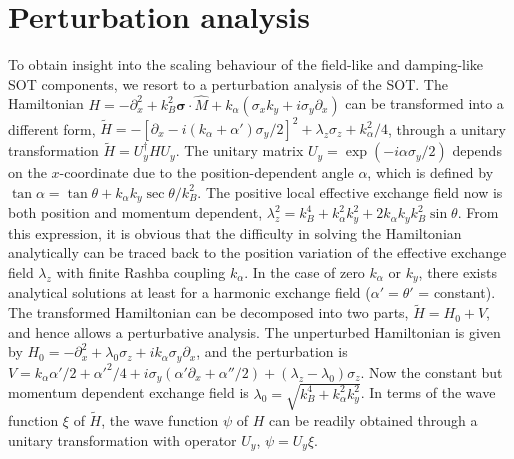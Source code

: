 \documentclass[12pt]{iopart}
\begin{document}
\section{Perturbation analysis}
\label{pertb}
To obtain insight into the scaling behaviour of the field-like and damping-like SOT components, we resort to a perturbation analysis of the SOT. The Hamiltonian $H = - \partial_x ^2 + k_B^2 \bm {\sigma } \cdot \hat {M} +  k_ \alpha (\sigma_x k_y + i \sigma_y \partial_x)$ can be transformed into a different form, $\tilde {H} = - [\partial_x - i (k_ \alpha + \alpha') \sigma_y/2 ]^2 + \lambda_z \sigma_z + k_ \alpha ^2/4$, through a unitary transformation $\tilde {H} = U_y^ \dagger H U_y$. The unitary matrix $U_y = \exp {(-i \alpha \sigma_y/2)}$ depends on the $x$-coordinate due to the position-dependent angle $\alpha$, which is defined by $\tan \alpha = \tan \theta + k_ \alpha k_y \sec \theta/k_B^2$. The positive local effective exchange field now is both position and momentum dependent, $\lambda_z^2 = k_B^4 + k_ \alpha^2 k_y^2 + 2 k_ \alpha k_y k_B^2 \sin \theta$. From this expression, it is obvious that the difficulty in solving the Hamiltonian analytically can be traced back to the position variation of the effective exchange field $\lambda_z$ with finite Rashba coupling $k_\alpha$. In the case of zero $k_\alpha$ or $k_y$, there exists analytical solutions at least for a harmonic exchange field ($\alpha' = \theta'$ = constant). The transformed Hamiltonian can be decomposed into two parts, $\tilde {H} = H_0 + V$, and hence allows a perturbative analysis. The unperturbed Hamiltonian is given by $H_0 = - \partial_x ^2 + \lambda_0 \sigma_z + i k_ \alpha \sigma_y \partial_x$, and the perturbation is $V = k_ \alpha \alpha'/2 + \alpha'^2/4 + i \sigma_y ( \alpha' \partial_x + \alpha''/2 ) + (\lambda_z - \lambda_0) \sigma_z$. Now the constant but momentum dependent exchange field is $\lambda_0 = \sqrt {k_B^4 + k_ \alpha^2 k_y^2}$. In terms of the wave function $\xi$ of $\tilde {H}$, the wave function $\psi$ of $H$ can be readily obtained through a unitary transformation with operator $U_y$, $\psi = U_y \xi$.
\end{document}
